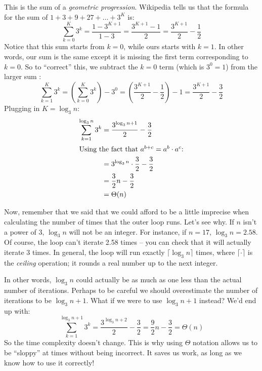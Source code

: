 \begin{prob}
\begin{soln}
        This is the sum of a \emph{geometric progression}. Wikipedia tells us that the formula
        for the sum of $1 + 3 + 9 + 27 + \ldots + 3^K$ is:
        \[
            \sum_{k=0}^{K} 3^k = \frac{1 - 3^{K+1}}{1 - 3} = \frac{3^{K+1} - 1}{2} = \frac{3^{K+1}}{2} - \frac12
        \]
        Notice that this sum starts from $k = 0$, while ours starts with $k = 1$. 
        In other words, our sum is the same except it is missing the first term corresponding
        to $k = 0$.
        So to 
        ``correct'' this, we subtract the $k = 0$ term (which is $3^0 = 1$)
        from the larger sum :
        \[
            \sum_{k=1}^{K} 3^k = 
            \left(\sum_{k=0}^{K} 3^k\right) - 3^0 = 
            \left(\frac{3^{K+1}}{2} - \frac12\right) - 1=
            \frac{3^{K+1}}{2} - \frac32
        \]
        Plugging in $K = \log_3 n$:
        \begin{align*}
            \sum_{k=1}^{\log_3 n} 3^k 
            &= \frac{3^{\log_3 n +1}}{2} - \frac32\\
            \intertext{Using the fact that $a^{b+c} = a^b \cdot a^c$:}
            &=
                3^{\log_3 n} \cdot \frac32 - \frac32\\
            &=
                \frac32n - \frac32\\
            &=
                \Theta(n)
        \end{align*}

        Now, remember that we said that we could afford to be a little imprecise when calculating
        the number of times that the outer loop runs. Let's see why. If $n$ isn't a power
        of $3$, $\log_3 n$ will not be an integer. For instance, if $n = 17$, $\log_3 n = 2.58$.
        Of course, the loop can't iterate 2.58 times -- you can check that it will actually iterate
        3 times. In general, the loop will run exactly $\lceil \log_3 n \rceil$ times, where
        $\lceil \cdot \rceil$ is the \emph{ceiling} operation; it rounds a real number up
        to the next integer.

        In other words, $\log_3 n$ could actually be as much as one less than the actual number
        of iterations. Perhaps to be careful we should overestimate the number of iterations
        to be $\log_3 n + 1$. What if we were to use $\log_3 n + 1$ instead? We'd end up with:
        \[
            \sum_{k=1}^{\log_3 n + 1} 3^k = \frac{3^{\log_3 n + 2}}{2} - \frac32 = \frac92 n - \frac32 = \Theta(n)
        \]
        So the time complexity doesn't change. This is why using $\Theta$ notation allows us
        to be ``sloppy'' at times without being incorrect. It saves us work, as long as
        we know how to use it correctly!
    \end{soln}

\end{prob}
